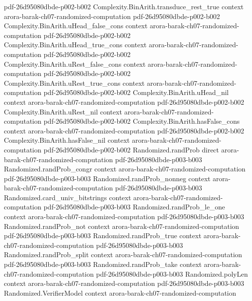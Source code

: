 \begin{theorem}
  {pdf-26d95080dbde-p002-b002}
\proofstep
  {Complexity.BinArith.transduce_rest_true}
  {context}
  {arora-barak-ch07-randomized-computation}
  {pdf-26d95080dbde-p002-b002}
\proofstep
  {Complexity.BinArith.uHead_false_cons}
  {context}
  {arora-barak-ch07-randomized-computation}
  {pdf-26d95080dbde-p002-b002}
\proofstep
  {Complexity.BinArith.uHead_true_cons}
  {context}
  {arora-barak-ch07-randomized-computation}
  {pdf-26d95080dbde-p002-b002}
\proofstep
  {Complexity.BinArith.uRest_false_cons}
  {context}
  {arora-barak-ch07-randomized-computation}
  {pdf-26d95080dbde-p002-b002}
\proofstep
  {Complexity.BinArith.uRest_true_cons}
  {context}
  {arora-barak-ch07-randomized-computation}
  {pdf-26d95080dbde-p002-b002}
\proofstep
  {Complexity.BinArith.uHead_nil}
  {context}
  {arora-barak-ch07-randomized-computation}
  {pdf-26d95080dbde-p002-b002}
\proofstep
  {Complexity.BinArith.uRest_nil}
  {context}
  {arora-barak-ch07-randomized-computation}
  {pdf-26d95080dbde-p002-b002}
\proofstep
  {Complexity.BinArith.hasFalse_cons}
  {context}
  {arora-barak-ch07-randomized-computation}
  {pdf-26d95080dbde-p002-b002}
\proofstep
  {Complexity.BinArith.hasFalse_nil}
  {context}
  {arora-barak-ch07-randomized-computation}
  {pdf-26d95080dbde-p002-b002}
\proofstep
  {Randomized.randProb}
  {direct}
  {arora-barak-ch07-randomized-computation}
  {pdf-26d95080dbde-p003-b003}
\proofstep
  {Randomized.randProb_congr}
  {context}
  {arora-barak-ch07-randomized-computation}
  {pdf-26d95080dbde-p003-b003}
\proofstep
  {Randomized.randProb_nonneg}
  {context}
  {arora-barak-ch07-randomized-computation}
  {pdf-26d95080dbde-p003-b003}
\proofstep
  {Randomized.card_univ_bitstrings}
  {context}
  {arora-barak-ch07-randomized-computation}
  {pdf-26d95080dbde-p003-b003}
\proofstep
  {Randomized.randProb_le_one}
  {context}
  {arora-barak-ch07-randomized-computation}
  {pdf-26d95080dbde-p003-b003}
\proofstep
  {Randomized.randProb_not}
  {context}
  {arora-barak-ch07-randomized-computation}
  {pdf-26d95080dbde-p003-b003}
\proofstep
  {Randomized.randProb_true}
  {context}
  {arora-barak-ch07-randomized-computation}
  {pdf-26d95080dbde-p003-b003}
\proofstep
  {Randomized.randProb_split}
  {context}
  {arora-barak-ch07-randomized-computation}
  {pdf-26d95080dbde-p003-b003}
\proofstep
  {Randomized.randProb_take}
  {context}
  {arora-barak-ch07-randomized-computation}
  {pdf-26d95080dbde-p003-b003}
\proofstep
  {Randomized.polyLen}
  {context}
  {arora-barak-ch07-randomized-computation}
  {pdf-26d95080dbde-p003-b003}
\proofstep
  {Randomized.VerifierModel}
  {context}
  {arora-barak-ch07-randomized-computation}

\end{theorem}
